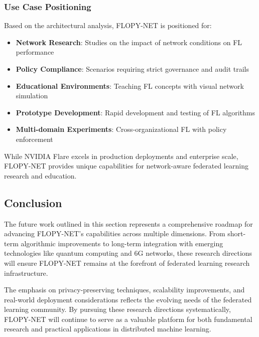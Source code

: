 \subsubsection{Use Case Positioning}

Based on the architectural analysis, FLOPY-NET is positioned for:

\begin{itemize}
    \item \textbf{Network Research}: Studies on the impact of network conditions on FL performance
    \item \textbf{Policy Compliance}: Scenarios requiring strict governance and audit trails
    \item \textbf{Educational Environments}: Teaching FL concepts with visual network simulation
    \item \textbf{Prototype Development}: Rapid development and testing of FL algorithms
    \item \textbf{Multi-domain Experiments}: Cross-organizational FL with policy enforcement
\end{itemize}

While NVIDIA Flare excels in production deployments and enterprise scale, FLOPY-NET provides unique capabilities for network-aware federated learning research and education.

\subsection{Conclusion}

The future work outlined in this section represents a comprehensive roadmap for advancing FLOPY-NET's capabilities across multiple dimensions. From short-term algorithmic improvements to long-term integration with emerging technologies like quantum computing and 6G networks, these research directions will ensure FLOPY-NET remains at the forefront of federated learning research infrastructure.

The emphasis on privacy-preserving techniques, scalability improvements, and real-world deployment considerations reflects the evolving needs of the federated learning community. By pursuing these research directions systematically, FLOPY-NET will continue to serve as a valuable platform for both fundamental research and practical applications in distributed machine learning.
